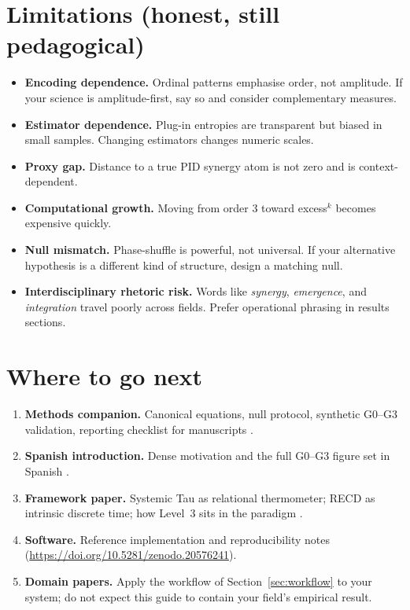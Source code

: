 \documentclass[11pt,a4paper]{article}
\begin{document}
\section{Limitations (honest, still pedagogical)}
\label{sec:limits}

\begin{itemize}[leftmargin=*,itemsep=3pt]
  \item \textbf{Encoding dependence.} Ordinal patterns emphasise order, not
  amplitude. If your science is amplitude-first, say so and consider
  complementary measures.
  \item \textbf{Estimator dependence.} Plug-in entropies are transparent but
  biased in small samples. Changing estimators changes numeric scales.
  \item \textbf{Proxy gap.} Distance to a true PID synergy atom is not zero
  and is context-dependent.
  \item \textbf{Computational growth.} Moving from order 3 toward excess$^k$
  becomes expensive quickly.
  \item \textbf{Null mismatch.} Phase-shuffle is powerful, not universal. If
  your alternative hypothesis is a different kind of structure, design a
  matching null.
  \item \textbf{Interdisciplinary rhetoric risk.} Words like
  \emph{synergy}, \emph{emergence}, and \emph{integration} travel poorly
  across fields. Prefer operational phrasing in results sections.
\end{itemize}

\section{Where to go next}
\label{sec:next}

\begin{enumerate}[leftmargin=*,itemsep=3pt]
  \item \textbf{Methods companion.}
  Canonical equations, null protocol, synthetic G0--G3 validation, reporting
  checklist for manuscripts \citep{Padilla2026excess3}.

  \item \textbf{Spanish introduction.}
  Dense motivation and the full G0--G3 figure set in Spanish
  \citep{Padilla2026intro}.

  \item \textbf{Framework paper.}
  Systemic Tau as relational thermometer; RECD as intrinsic discrete time;
  how Level~3 sits in the paradigm \citep{Padilla2026framework}.

  \item \textbf{Software.}
  Reference implementation and reproducibility notes
  \citep{Padilla2026software}
  (\url{https://doi.org/10.5281/zenodo.20576241}).

  \item \textbf{Domain papers.}
  Apply the workflow of Section~\ref{sec:workflow} to your system; do not
  expect this guide to contain your field's empirical result.
\end{enumerate}
\end{document}

